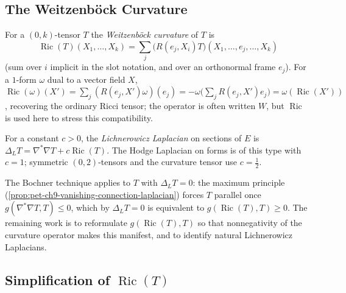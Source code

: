 \subsection{The Weitzenböck Curvature}

\begin{definition}
  \label{def:pet-ch9-weitzenbock-curvature-operator}
  For a $(0,k)$-tensor $T$ the \emph{Weitzenböck curvature} of $T$ is
  \[
    \operatorname{Ric}(T)(X_1,\dots,X_k)=\sum_j\big(R(e_j,X_i)T\big)(X_1,\dots,e_j,\dots,X_k)
  \]
  (sum over $i$ implicit in the slot notation, and over an orthonormal frame
  $e_j$). For a $1$-form $\omega$ dual to a vector field $X$, $\operatorname{Ric}(\omega)(X')
  =\sum_j(R(e_j,X')\omega)(e_j)=-\omega\big(\sum_jR(e_j,X')e_j\big)=\omega(\operatorname{Ric}(X'))$,
  recovering the ordinary Ricci tensor; the operator is often written $W$, but
  $\operatorname{Ric}$ is used here to stress this compatibility.
\end{definition}

\begin{definition}
  \label{def:pet-ch9-lichnerowicz-laplacian}
  For a constant $c>0$, the \emph{Lichnerowicz Laplacian} on sections of $E$ is
  $\Delta_LT=\nabla^*\nabla T+c\operatorname{Ric}(T)$. The Hodge Laplacian on forms is of
  this type with $c=1$; symmetric $(0,2)$-tensors and the curvature tensor use
  $c=\tfrac12$.
\end{definition}

The Bochner technique applies to $T$ with $\Delta_LT=0$: the maximum principle
(\cref{prop:pet-ch9-vanishing-connection-laplacian}) forces $T$ parallel once
$g(\nabla^*\nabla T,T)\le0$, which by $\Delta_LT=0$ is equivalent to
$g(\operatorname{Ric}(T),T)\ge0$. The remaining work is to reformulate
$g(\operatorname{Ric}(T),T)$ so that nonnegativity of the curvature operator makes this
manifest, and to identify natural Lichnerowicz Laplacians.

\subsection{Simplification of $\operatorname{Ric}(T)$}

